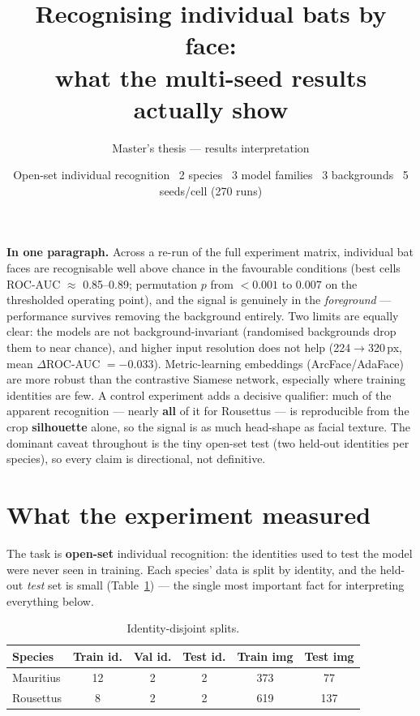 \documentclass[11pt]{article}
\title{\vspace{-1.4cm}\bfseries Recognising individual bats by face:\\[2pt]
\large what the multi-seed results actually show}
\author{\normalsize Master's thesis --- results interpretation}
\date{\normalsize Open-set individual recognition \textbullet\ 2 species \textbullet\ 3 model families
\textbullet\ 3 backgrounds \textbullet\ 5 seeds/cell (270 runs)}
\newcommand{\bd}[1]{\textcolor{poor}{#1}}
\begin{document}
\maketitle
\vspace{-0.8em}

\begin{callout}
\textbf{In one paragraph.} Across a re-run of the full experiment matrix, individual bat faces are
recognisable well above chance in the favourable conditions (best cells ROC-AUC $\approx$
0.85--0.89; permutation $p$ from $<0.001$ to $0.007$ on the thresholded operating point), and the signal is genuinely in the
\emph{foreground} --- performance survives removing the background entirely. Two limits are equally
clear: the models are not background-invariant (randomised backgrounds drop them to near chance),
and higher input resolution does not help (224$\to$320\,px, mean $\Delta$ROC-AUC $=-0.033$).
Metric-learning embeddings (ArcFace/AdaFace) are more robust than the contrastive Siamese network,
especially where training identities are few. A control experiment adds a decisive qualifier: much
of the apparent recognition --- nearly \textbf{all} of it for Rousettus --- is reproducible from the
crop \textbf{silhouette} alone, so the signal is as much head-shape as facial texture. The dominant
caveat throughout is the tiny open-set test (two held-out identities per species), so every claim is
directional, not definitive.
\end{callout}

\section{What the experiment measured}
The task is \textbf{open-set} individual recognition: the identities used to test the model were
never seen in training. Each species' data is split by identity, and the held-out \emph{test} set is
small (Table~\ref{tab:splits}) --- the single most important fact for interpreting everything below.

\begin{table}[h]\centering
\caption{Identity-disjoint splits.}\label{tab:splits}
\begin{tabular}{lccccc}
\toprule
Species & Train id. & Val id. & Test id. & Train img & Test img \\
\midrule
Mauritius & 12 & 2 & \bd{2} & 373 & 77 \\
Rousettus & 8 & 2 & \bd{2} & 619 & 137 \\
\bottomrule
\end{tabular}
\end{table}
\end{document}
